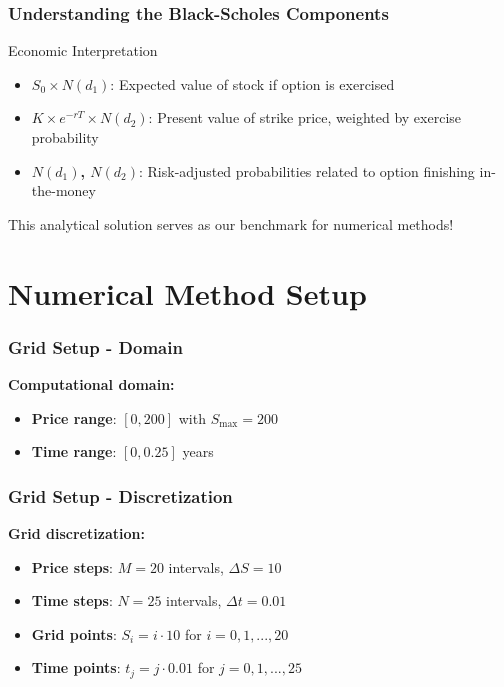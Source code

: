 \documentclass[aspectratio=169]{beamer}
\begin{document}
\begin{frame}
\frametitle{Understanding the Black-Scholes Components}
\begin{block}{Economic Interpretation}
\begin{itemize}
\item \textbf{$S_0 \times N(d_1)$}: Expected value of stock if option is exercised
\item \textbf{$K \times e^{-rT} \times N(d_2)$}: Present value of strike price, weighted by exercise probability
\item \textbf{$N(d_1)$, $N(d_2)$}: Risk-adjusted probabilities related to option finishing in-the-money
\end{itemize}
\end{block}

This analytical solution serves as our benchmark for numerical methods!
\end{frame}

\section{Numerical Method Setup}

\begin{frame}
\frametitle{Grid Setup - Domain}
\textbf{Computational domain:}

\begin{itemize}
\item \textbf{Price range}: $[0, 200]$ with $S_{\max} = 200$
\item \textbf{Time range}: $[0, 0.25]$ years
\end{itemize}
\end{frame}

\begin{frame}
\frametitle{Grid Setup - Discretization}
\textbf{Grid discretization:}

\begin{itemize}
\item \textbf{Price steps}: $M = 20$ intervals, $\Delta S = 10$
\item \textbf{Time steps}: $N = 25$ intervals, $\Delta t = 0.01$
\item \textbf{Grid points}: $S_i = i \cdot 10$ for $i = 0, 1, ..., 20$
\item \textbf{Time points}: $t_j = j \cdot 0.01$ for $j = 0, 1, ..., 25$
\end{itemize}
\end{frame}
\end{document}
